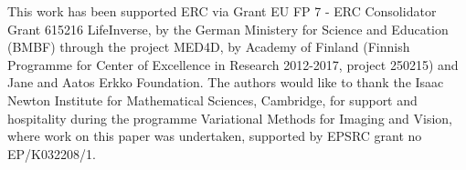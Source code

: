 \documentclass[12pt,a4paper]{article}
\numberwithin{equation}{section}
\begin{document}
This work has been supported  ERC via Grant EU FP 7 - ERC Consolidator Grant 615216 LifeInverse, by the German Ministery for Science and Education (BMBF) through the project MED4D, by Academy of Finland (Finnish Programme for Center of Excellence in Research 2012-2017, project 250215) and Jane and Aatos Erkko Foundation. 
The authors would like to thank the Isaac Newton Institute for   Mathematical Sciences, Cambridge, for support and hospitality during  the programme Variational Methods for Imaging and Vision, where work on this paper was  undertaken, supported by EPSRC grant no EP/K032208/1.  



\end{document}

